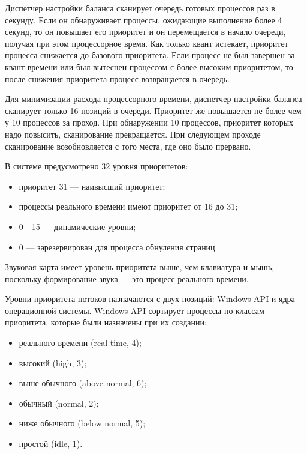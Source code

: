 Диспетчер настройки баланса сканирует очередь готовых процессов раз в секунду. Если он обнаруживает процессы, ожидающие выполнение более 4 секунд, то он повышает его приоритет и он перемещается в начало очереди, получая при этом процессорное время. Как только квант истекает, приоритет процесса снижается до базового приоритета. Если процесс не был завершен за квант времени или был вытеснен процессом с более высоким приоритетом, то после снижения приоритета процесс возвращается в очередь. 

Для минимизации расхода процессорного времени, диспетчер настройки баланса сканирует только 16 позиций в очереди. Приоритет же повышается не более чем у 10 процессов за проход. При обнаружении 10 процессов, приоритет которых надо повысить, сканирование прекращается. При следующем проходе сканирование возобновляется с того места, где оно было прервано. 

В системе предусмотрено 32 уровня приоритетов:
\begin{itemize}
	\item приоритет 31 --- наивысший приоритет;
	\item процессы реального времени имеют приоритет от 16 до 31;
	\item 0 - 15 --- динамические уровни;
	\item 0 --- зарезервирован для процесса обнуления страниц.
\end{itemize}

Звуковая карта имеет уровень приоритета выше, чем клавиатура и мышь, поскольку формирование звука --- это процесс реального времени. 

Уровни приоритета потоков назначаются с двух позиций: Windows API и ядра операционной системы. Windows API сортирует процессы по классам приоритета, которые были назначены при их создании:
\begin{itemize}
	\item реального времени (real-time, 4);
	\item высокий (high, 3);
	\item выше обычного (above normal, 6);
	\item обычный (normal, 2);
	\item ниже обычного (below normal, 5);
	\item простой (idle, 1).
\end{itemize}

